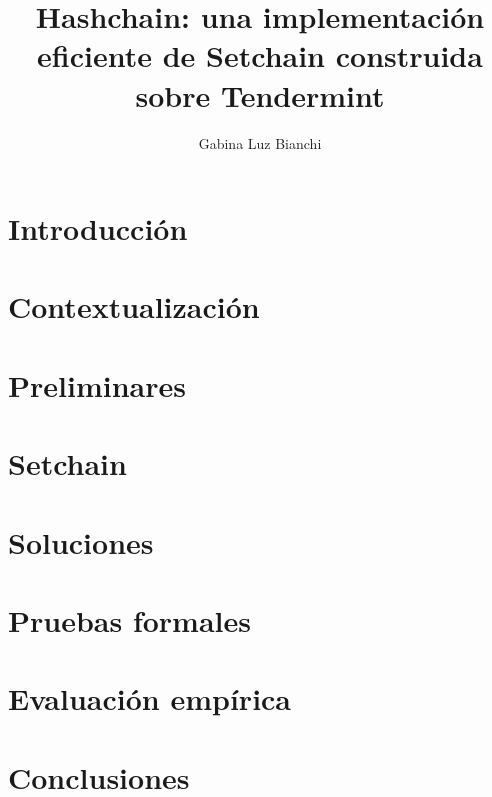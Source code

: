 \documentclass[12pt, oneside]{book}
\title{Hashchain: una implementación eficiente de Setchain construida sobre Tendermint}
\author{Gabina Luz Bianchi}
\begin{document}
\maketitle

%

\tableofcontents{}

\chapter{Introducción}


\chapter{Contextualización}


\chapter{Preliminares}


\chapter{Setchain}\label{chapter:setchain}


\chapter{Soluciones}\label{chapter:sol}


\chapter{Pruebas formales}


\chapter{Evaluación empírica}


\chapter{Conclusiones}

\end{document}
